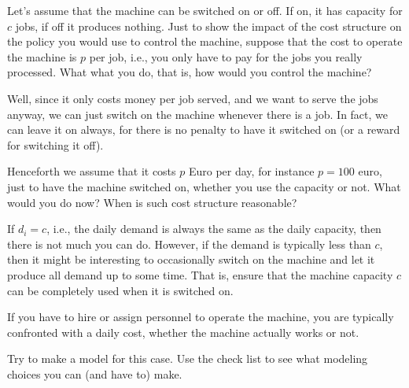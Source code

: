 \begin{question}
  Let's assume that the machine can be switched on or off.  If on, it
  has capacity for $c$ jobs, if off it produces nothing.  Just to show
  the impact of the cost structure on the policy you would use to
  control the machine, suppose that the cost to operate the machine is
  $p$ per job, i.e., you only have to pay for the jobs you really
  processed. What what you do, that is, how would you control the
  machine?
\end{question}

  \begin{solution}
    Well, since it only costs money per job served, and we want to
    serve the jobs anyway, we can just switch on the machine whenever
    there is a job. In fact, we can leave it on always, for there is
    no penalty to have it switched on (or a reward for switching it
    off).
  \end{solution}


\begin{question}
  Henceforth we assume that it costs $p$ Euro per day, for instance
  $p=100$ euro, just to have the machine switched on, whether you use
  the capacity or not. What would you do now? When is such cost structure reasonable?
\end{question}

  \begin{solution}
    If $d_i=c$, i.e., the daily demand is always the same as the daily
    capacity, then there is not much you can do. However, if the
    demand is typically less than $c$, then it might be interesting to
    occasionally switch on the machine and let it produce all demand
    up to some time. That is, ensure that the machine capacity $c$ can
    be completely used when it is switched on. 

    If you have to hire or assign personnel to operate the machine, you
    are typically confronted with a daily cost, whether the machine
    actually works or not.
  \end{solution}


\begin{question}
  Try to make a model for this case.  Use the check list to see what
  modeling choices you can (and have to) make.
\end{question}

